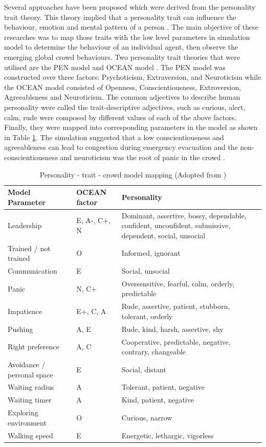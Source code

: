 Several approaches have been proposed which were derived from the personality trait theory. This theory implied that a personality trait can influence the behaviour, emotion and mental pattern of a person \parencite{Durupinar2008}. The main objective of these researches was to map those traits with the low level parameters in simulation model to determine the behaviour of an individual agent, then observe the emerging global crowd behaviours. Two personality trait theories that were utilised are the PEN model \parencite{Guy2011} and OCEAN model \parencite{Durupinar2008,Durupinar2011}. The PEN model was constructed over three factors: Psychoticism, Extraversion, and Neuroticism while the OCEAN model consisted of Openness, Conscientiousness, Extroversion, Agreeableness and Neuroticism. The common adjectives to describe human personality were called the trait-descriptive adjectives, such as curious, alert, calm, rude were composed by different values of each of the above factors. Finally, they were mapped into corresponding parameters in the model as shown in Table \ref{table:oceanPersonality}. The simulation suggested that a low conscientiousness and agreeableness can lead to congestion during emergency evacuation and the non-conscientiousness and neuroticism was the root of panic in the crowd \parencite{Durupinar2008}.

\begin{table}[!htbp]
	\caption{Personality - trait - crowd model mapping (Adopted from \textcite{Durupinar2008})}
	\label{table:oceanPersonality}
	\centering
	\begin{tabular}{|l|l|p{6.5cm}|}
		\hline
		\textbf{Model Parameter} & \textbf{OCEAN factor} & \textbf{Personality} \\ \hline \hline
		Leadership & E, A-, C+, N & Dominant, assertive, bossy, dependable, confident, unconfident, submissive, dependent, social, unsocial \\ \hline
		Trained / not trained & O & Informed, ignorant \\ \hline
		Communication & E & Social, unsocial \\ \hline
		Panic & N, C+ & Oversensitive, fearful, calm, orderly, predictable \\ \hline
		Impatience & E+, C, A & Rude, assertive, patient, stubborn, tolerant, orderly \\ \hline
		Pushing & A, E & Rude, kind, harsh, assertive, shy \\ \hline
		Right preference & A, C & Cooperative, predictable, negative, contrary, changeable \\ \hline
		Avoidance / personal space & E & Social, distant \\ \hline
		Waiting radius & A & Tolerant, patient, negative \\ \hline
		Waiting timer & A & Kind, patient, negative \\ \hline
		Exploring environment & O & Curious, narrow \\ \hline
		Walking speed & E & Energetic, lethargic, vigorless \\ \hline
	\end{tabular}
\end{table}

